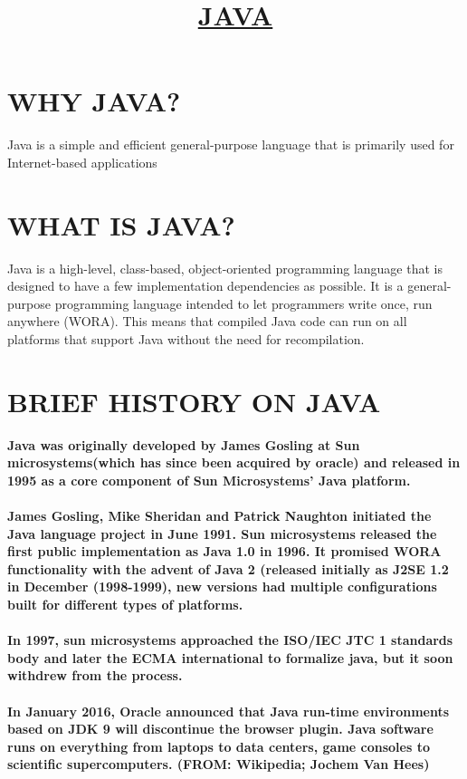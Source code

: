 \documentclass{article}
\begin{document}
	\title{\underline{\textbf{JAVA}}}
	\maketitle
	\section{WHY JAVA?}
	Java is a simple and efficient general-purpose language that is primarily used for Internet-based applications
	\section{WHAT IS JAVA?}
	Java is a high-level, class-based, object-oriented programming language that is designed to have a few implementation dependencies as possible. It is a general-purpose programming language intended to let programmers write once, run anywhere (WORA). This means that compiled Java code can run on all platforms that support Java without the need for recompilation. 
	\section{BRIEF HISTORY ON JAVA}
	\textbf{Java was originally developed by James Gosling at Sun microsystems(which has since been acquired by oracle) and released in 1995 as a core component of Sun Microsystems’ Java platform.}
	\paragraph{James Gosling, Mike Sheridan and Patrick Naughton initiated the Java language project in June 1991. Sun microsystems released the first public implementation as Java 1.0 in 1996. It promised WORA functionality with the advent of Java 2 (released initially as J2SE 1.2 in December (1998-1999), new versions had multiple configurations built for different types of platforms.}
	\paragraph{In 1997, sun microsystems approached the ISO/IEC JTC 1 standards body and later the ECMA international to formalize java, but it soon withdrew from the process.}
	\paragraph{In January 2016, Oracle announced that Java run-time environments based on JDK 9 will discontinue the browser plugin. Java software runs on everything from laptops to data centers, game consoles to scientific supercomputers. (FROM: Wikipedia; Jochem Van Hees)}
	
\end{document}
